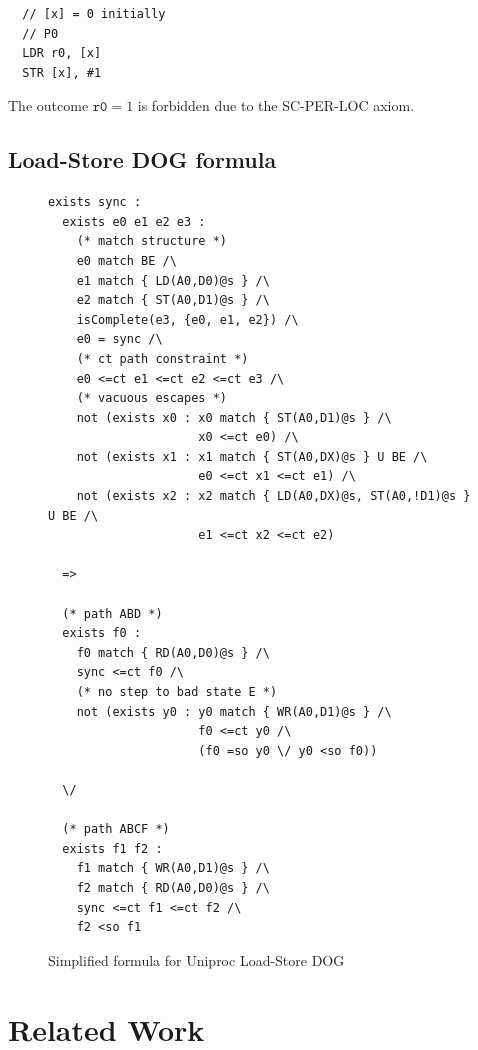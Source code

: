 \documentclass[10pt]{paper}
\newcommand{\axiom}[1]{\textsc{#1}}
\begin{document}
\begin{verbatim}
  // [x] = 0 initially
  // P0
  LDR r0, [x]
  STR [x], #1
\end{verbatim}

The outcome $\texttt{r0} = 1$ is forbidden due to the \axiom{SC-PER-LOC} axiom.

\subsection{Load-Store DOG formula}

\begin{figure}[p]
\begin{verbatim}
exists sync :
  exists e0 e1 e2 e3 :
    (* match structure *)
    e0 match BE /\
    e1 match { LD(A0,D0)@s } /\
    e2 match { ST(A0,D1)@s } /\
    isComplete(e3, {e0, e1, e2}) /\
    e0 = sync /\
    (* ct path constraint *)
    e0 <=ct e1 <=ct e2 <=ct e3 /\
    (* vacuous escapes *)
    not (exists x0 : x0 match { ST(A0,D1)@s } /\
                     x0 <=ct e0) /\
    not (exists x1 : x1 match { ST(A0,DX)@s } U BE /\
                     e0 <=ct x1 <=ct e1) /\
    not (exists x2 : x2 match { LD(A0,DX)@s, ST(A0,!D1)@s } U BE /\
                     e1 <=ct x2 <=ct e2)

  =>

  (* path ABD *)
  exists f0 :
    f0 match { RD(A0,D0)@s } /\
    sync <=ct f0 /\
    (* no step to bad state E *)
    not (exists y0 : y0 match { WR(A0,D1)@s } /\
                     f0 <=ct y0 /\
                     (f0 =so y0 \/ y0 <so f0))

  \/

  (* path ABCF *)
  exists f1 f2 :
    f1 match { WR(A0,D1)@s } /\
    f2 match { RD(A0,D0)@s } /\
    sync <=ct f1 <=ct f2 /\
    f2 <so f1
\end{verbatim}
\caption{Simplified formula for Uniproc Load-Store DOG}
\label{fig:loadstore-formula}
\end{figure}


\section{Related Work}



\end{document}
